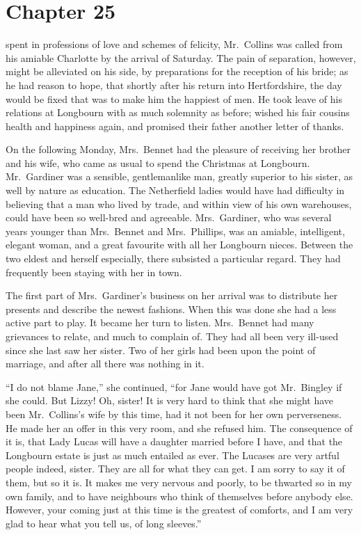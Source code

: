 \chapter{Chapter 25}


 spent in professions of love and schemes of felicity,
Mr.\ Collins was called from his amiable Charlotte by the arrival
of Saturday.  The pain of separation, however, might be
alleviated on his side, by preparations for the reception of his
bride; as he had reason to hope, that shortly after his return into
Hertfordshire, the day would be fixed that was to make him the
happiest of men.  He took leave of his relations at Longbourn
with as much solemnity as before; wished his fair cousins health
and happiness again, and promised their father another letter of
thanks.

On the following Monday, Mrs.\ Bennet had the pleasure of
receiving her brother and his wife, who came as usual to spend
the Christmas at Longbourn.  Mr.\ Gardiner was a sensible,
gentlemanlike man, greatly superior to his sister, as well by
nature as education.  The Netherfield ladies would have had
difficulty in believing that a man who lived by trade, and within
view of his own warehouses, could have been so well-bred and
agreeable.  Mrs.\ Gardiner, who was several years younger than
Mrs.\ Bennet and Mrs.\ Phillips, was an amiable, intelligent,
elegant woman, and a great favourite with all her Longbourn
nieces.  Between the two eldest and herself especially, there
subsisted a particular regard.  They had frequently been staying
with her in town.

The first part of Mrs.\ Gardiner's business on her arrival was to
distribute her presents and describe the newest fashions.  When
this was done she had a less active part to play.  It became her
turn to listen.  Mrs.\ Bennet had many grievances to relate, and
much to complain of.  They had all been very ill-used since she
last saw her sister.  Two of her girls had been upon the point of
marriage, and after all there was nothing in it.

``I do not blame Jane,'' she continued, ``for Jane would have got
Mr.\ Bingley if she could.  But Lizzy!  Oh, sister!  It is very hard
to think that she might have been Mr.\ Collins's wife by this time,
had it not been for her own perverseness.  He made her an offer
in this very room, and she refused him.  The consequence of it is,
that Lady Lucas will have a daughter married before I have, and
that the Longbourn estate is just as much entailed as ever.  The
Lucases are very artful people indeed, sister.  They are all for
what they can get.  I am sorry to say it of them, but so it is.
It makes me very nervous and poorly, to be thwarted so in my own
family, and to have neighbours who think of themselves before
anybody else.  However, your coming just at this time is the
greatest of comforts, and I am very glad to hear what you tell us,
of long sleeves.''

